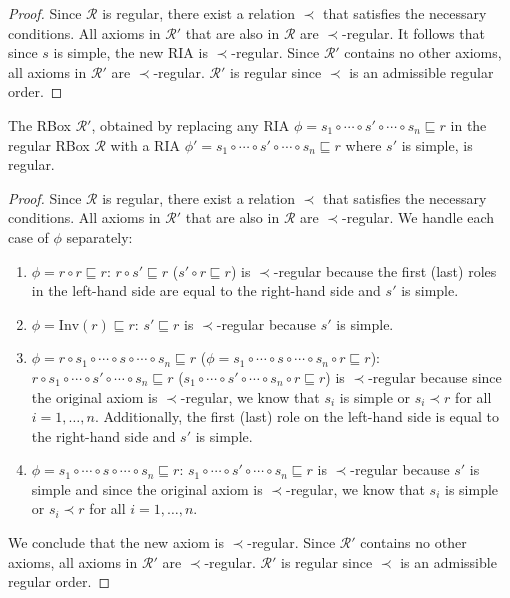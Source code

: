 \begin{proof}
Since $\mathcal{R}$ is regular, there exist a relation $\prec$ that satisfies the necessary conditions.
All axioms in $\mathcal{R}'$ that are also in $\mathcal{R}$ are $\prec$-regular.
It follows that since $s$ is simple, the new RIA is $\prec$-regular.
Since $\mathcal{R}'$ contains no other axioms, all axioms in $\mathcal{R}'$ are $\prec$-regular.
$\mathcal{R}'$ is regular since $\prec$ is an admissible regular order.
\end{proof}

\begin{lemma} \label{lem:regular-left}
The RBox $\mathcal{R}'$, obtained by replacing any RIA $\phi = s_1 \circ \cdots \circ s' \circ \cdots \circ s_n \sqsubseteq r$ in the regular RBox $\mathcal{R}$ with a RIA $\phi' = s_1 \circ \cdots \circ s' \circ \cdots \circ s_n \sqsubseteq r$ where $s'$ is simple, is regular.
\end{lemma}

\begin{proof}
Since $\mathcal{R}$ is regular, there exist a relation $\prec$ that satisfies the necessary conditions.
All axioms in $\mathcal{R}'$ that are also in $\mathcal{R}$ are $\prec$-regular.
We handle each case of $\phi$ separately:
\begin{enumerate}[label=(\roman*)]
    \item $\phi = r \circ r \sqsubseteq r$: $r \circ s' \sqsubseteq r$ ($s' \circ r \sqsubseteq r$) is $\prec$-regular because the first (last) roles in the left-hand side are equal to the right-hand side and $s'$ is simple.
    \item $\phi = \mathrm{Inv}(r) \sqsubseteq r$: $s' \sqsubseteq r$ is $\prec$-regular because $s'$ is simple.
    \item $\phi = r \circ s_1 \circ \cdots \circ s \circ \cdots \circ s_n \sqsubseteq r$ ($\phi = s_1 \circ \cdots \circ s \circ \cdots \circ s_n \circ r \sqsubseteq r$): $r \circ s_1 \circ \cdots \circ s' \circ \cdots \circ s_n \sqsubseteq r$ ($s_1 \circ \cdots \circ s' \circ \cdots \circ s_n \circ r \sqsubseteq r$) is $\prec$-regular because since the original axiom is $\prec$-regular, we know that $s_i$ is simple or $s_i \prec r$ for all $i = 1, \dots, n$. Additionally, the first (last) role on the left-hand side is equal to the right-hand side and $s'$ is simple.
    \item $\phi = s_1 \circ \cdots \circ s \circ \cdots \circ s_n \sqsubseteq r$: $s_1 \circ \cdots \circ s' \circ \cdots \circ s_n \sqsubseteq r$ is $\prec$-regular because $s'$ is simple and since the original axiom is $\prec$-regular, we know that $s_i$ is simple or $s_i \prec r$ for all $i = 1, \dots, n$.
\end{enumerate}

We conclude that the new axiom is $\prec$-regular.
Since $\mathcal{R}'$ contains no other axioms, all axioms in $\mathcal{R}'$ are $\prec$-regular.
$\mathcal{R}'$ is regular since $\prec$ is an admissible regular order.
\end{proof}

